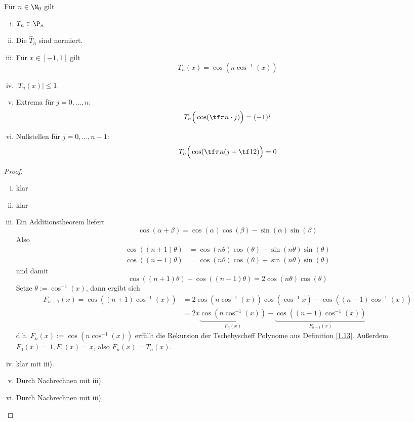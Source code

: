 \documentclass[11pt]{scrbook}
\begin{document}
\begin{st}
	\label{1.14}
	Für $n\in \N_0$ gilt
	\begin{enumerate}[i)]
		\item 
			$T_n\in \P_n$
		\item
			Die $\hat T_n$ sind normiert.
		\item
			Für $x\in [-1,1]$ gilt
			\[
				T_n(x) = \cos(n\cos^{-1}(x))
			\]
		\item
			$|T_n(x)| \le 1$
		\item
			Extrema für $j=0,\dotsc,n$:
			\[
				T_n\Big(\cos(\tf \pi n \cdot j)\Big) = (-1)^j
			\]
		\item
			Nullstellen für $j=0,\dotsc,n-1$:
			\[
				T_n\Big(\cos(\tf\pi n (j + \tf 12)\Big) = 0
			\]
	\end{enumerate}
	\begin{proof}
		\begin{enumerate}[i)]
			\item klar
			\item klar
			\item
				Ein Additionstheorem liefert
				\[
					\cos(\alpha+\beta) = \cos(\alpha)\cos(\beta) - \sin(\alpha)\sin(\beta)
				\]
				Also
				\begin{align*}
					\cos((n+1)\theta) &= \cos(n\theta) \cos(\theta) - \sin(n\theta) \sin(\theta)\\
					\cos((n-1)\theta) &= \cos(n\theta) \cos(\theta) + \sin(n\theta) \sin(\theta)
				\end{align*}
				und damit
				\[
					\cos((n+1)\theta) + \cos((n-1)\theta) = 2 \cos(n\theta)\cos(\theta)
				\]
				Setze $\theta:= \cos^{-1}(x)$, dann ergibt sich
				\begin{align*}
					F_{n+1}(x) = \cos((n+1)\cos^{-1}(x)) &= 2\cos(n\cos^{-1}(x)) \cos(\cos^{-1}x) - \cos((n-1)\cos^{-1}(x))\\
					&= 2x \underbrace{\cos(n\cos^{-1}(x))}_{F_n(x)} - \underbrace{\cos((n-1)\cos^{-1}(x))}_{F_{n-1}(x)}
				\end{align*}
				d.h. $F_n(x):= \cos(n\cos^{-1}(x))$ erfüllt die Rekursion der Tschebyscheff Polynome aus Definition \ref{1.13}.
				Außerdem  $F_0(x)=1, F_1(x)=x$, also $F_n(x)=T_n(x)$.
			\item
				klar mit iii).
			\item
				Durch Nachrechnen mit iii).
			\item
				Durch Nachrechnen mit iii).
		\end{enumerate}
	\end{proof}
\end{st}
\end{document}
